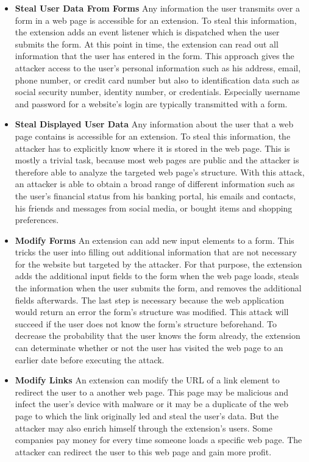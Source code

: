 	\begin{itemize}
		\item \textbf{Steal User Data From Forms} Any information the user transmits over a form in a web page is accessible for an extension. To steal this information, the extension adds an event listener which is dispatched when the user submits the form. At this point in time, the extension can read out all information that the user has entered in the form. This approach gives the attacker access to the user's personal information such as his address, email, phone number, or credit card number but also to identification data such as social security number, identity number, or credentials. Especially username and password for a website's login are typically transmitted with a form.
		
		\item \textbf{Steal Displayed User Data} Any information about the user that a web page contains is accessible for an extension. To steal this information, the attacker has to explicitly know where it is stored in the web page. This is mostly a trivial task, because most web pages are public and the attacker is therefore able to analyze the targeted web page's structure. With this attack, an attacker is able to obtain a broad range of different information such as the user's financial status from his banking portal, his emails and contacts, his friends and messages from social media, or bought items and shopping preferences.
		
		\item \textbf{Modify Forms} An extension can add new input elements to a form. This tricks the user into filling out additional information that are not necessary for the website but targeted by the attacker. For that purpose, the extension adds the additional input fields to the form when the web page loads, steals the information when the user submits the form, and removes the additional fields afterwards. The last step is necessary because the web application would return an error the form's structure was modified. This attack will succeed if the user does not know the form's structure beforehand. To decrease the probability that the user knows the form already, the extension can determinate whether or not the user has visited the web page to an earlier date before executing the attack. 
		
		\item \textbf{Modify Links} An extension can modify the URL of a link element to redirect the user to a another web page. This page may be malicious and infect the user's device with malware or it may be a duplicate of the web page to which the link originally led and steal the user's data. But the attacker may also enrich himself through the extension's users. Some companies pay money for every time someone loads a specific web page. The attacker can redirect the user to this web page and gain more profit.


\end{itemize}
